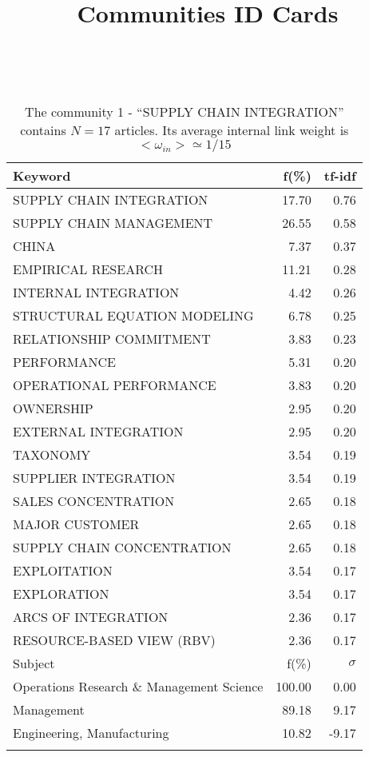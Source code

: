 \documentclass[a4paper,11pt]{report}
\title{{\bf Communities ID Cards}}
\date{\begin{flushleft}This document gather the ``ID Cards'' of the CC communities found within your database.\\
 The CC network was built by keeping a link between articles sharing at least 5 references. The communities characterized here correspond to the ones found in the level 1 (in the sense of the Louvain algo) which gathers more than 0 articles.\\
 These ID cards displays the most frequent keywords, subject categories, journals of publication, institution, countries, authors, references and reference journals of the articles of each community. The significance of an item $\sigma = \sqrt{N} (f - p) / \sqrt{p(1-p)}$ [where $N$ is the number of articles within the community and $f$ and $p$ are the proportion of articles respectively within the community and within the database displaying that item ] is also given (for example $\sigma > 5$ is really highly significant). The tf-idf value which can be calculated by $tf-idf = f*log(frac{1}{p})$ is also given.\\
\vspace{1cm}
\copyright Sebastian Grauwin, Liu Weizhi - (2014) \end{flushleft}}
\begin{document}
\begin{landscape}
\maketitle
\clearpage

\begin{table}[!ht]
\caption{The community 1 - ``SUPPLY CHAIN INTEGRATION'' contains $N = 17$ articles. Its average internal link weight is $<\omega_{in}> \simeq 1/15$ }
\textcolor{white}{aa}\\
{\scriptsize\begin{tabular}{|l r  r|}
\hline
Keyword & f(\%) & tf-idf \\
\hline
SUPPLY CHAIN INTEGRATION & 17.70 & 0.76\\
SUPPLY CHAIN MANAGEMENT & 26.55 & 0.58\\
CHINA & 7.37 & 0.37\\
EMPIRICAL RESEARCH & 11.21 & 0.28\\
INTERNAL INTEGRATION & 4.42 & 0.26\\
STRUCTURAL EQUATION MODELING & 6.78 & 0.25\\
RELATIONSHIP COMMITMENT & 3.83 & 0.23\\
PERFORMANCE & 5.31 & 0.20\\
OPERATIONAL PERFORMANCE & 3.83 & 0.20\\
OWNERSHIP & 2.95 & 0.20\\
EXTERNAL INTEGRATION & 2.95 & 0.20\\
TAXONOMY & 3.54 & 0.19\\
SUPPLIER INTEGRATION & 3.54 & 0.19\\
SALES CONCENTRATION & 2.65 & 0.18\\
MAJOR CUSTOMER & 2.65 & 0.18\\
SUPPLY CHAIN CONCENTRATION & 2.65 & 0.18\\
EXPLOITATION & 3.54 & 0.17\\
EXPLORATION & 3.54 & 0.17\\
ARCS OF INTEGRATION & 2.36 & 0.17\\
RESOURCE-BASED VIEW (RBV) & 2.36 & 0.17\\
\hline
\hline
Subject & f(\%) & $\sigma$\\
\hline
Operations Research \& Management Science & 100.00 & 0.00\\
Management & 89.18 & 9.17\\
Engineering, Manufacturing & 10.82 & -9.17\\
 &  & \\

\end{tabular}}
\end{table}
\end{landscape}
\end{document}
